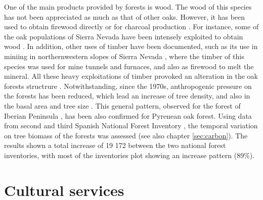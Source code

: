 One of the main products provided by forests is wood. The wood of this species has not been appreciated as much as that of other oaks. However, it has been used to obtain firewood directly or for charcoal production \autocites{MontoyaMeson1979SituacionActual}. For instance, some of the oak populations of Sierra Nevada have been intensely exploited to obtain wood \autocites[\emph{e.g.} Robledal de Cáñar, Alpujarras,][]{ValbuenaCarabanaGil2013GeneticResilience,MorenoLlorca2016}. In addition, other uses of timber have been documented, such as its use in miniing in northernwestern slopes of Sierra Nevada \autocites{Titos1990}, where the timber of this species was used for mine tunnels and furnaces, and also as firewood to melt the mineral. All these heavy exploitations of timber provoked an alteration in the oak forests structrure \autocite{PerezLuqueetal2020LanduseLegacies}. Notwithstanding, since the 1970s, anthropogenic pressure on the forests has been reduced, which lead an increase of tree density, and also in the basal area and tree size \autocite{GonzalezDiazetal2020BosquesEspanoles}. This general pattern, observed for the forest of Iberian Peninsula \autocite{Astigarragaetal2020EvidenceNon,GonzalezDiazetal2020BosquesEspanoles}, has been also confirmed for Pyrenean oak forest. Using data from second and third Spanish National Forest Inventory \autocites{VillaescusaDiaz1998SegundoInventario,Villanueva2005TercerInventario}, the temporal variation on tree biomass of the \Qp forests was assessed \autocites{PerezLuqueetal2021CarbonSequestration} (see also chapter \ref{sec:carbon}). The results shown a total increase of 19 172 \mgha between the two national forest inventories, with most of the inventories plot showing an increase pattern (89\%). 


\section{Cultural services}\label{sec:es:cultural}
